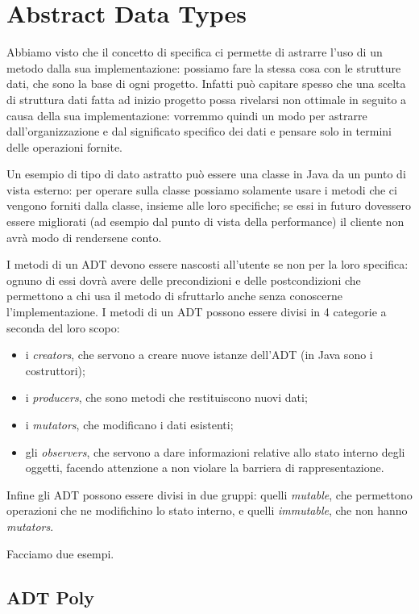 \section{Abstract Data Types}
Abbiamo visto che il concetto di specifica ci permette di astrarre l'uso di un metodo dalla sua implementazione: possiamo fare la stessa cosa con le strutture dati, che sono la base di ogni progetto. Infatti può capitare spesso che una scelta di struttura dati fatta ad inizio progetto possa rivelarsi non ottimale in seguito a causa della sua implementazione: vorremmo quindi un modo per astrarre dall'organizzazione e dal significato specifico dei dati e pensare solo in termini delle operazioni fornite.

Un esempio di tipo di dato astratto può essere una classe in Java da un punto di vista esterno: per operare sulla classe possiamo solamente usare i metodi che ci vengono forniti dalla classe, insieme alle loro specifiche; se essi in futuro dovessero essere migliorati (ad esempio dal punto di vista della performance) il cliente non avrà modo di rendersene conto.

I metodi di un ADT devono essere nascosti all'utente se non per la loro specifica: ognuno di essi dovrà avere delle precondizioni e delle postcondizioni che permettono a chi usa il metodo di sfruttarlo anche senza conoscerne l'implementazione. I metodi di un ADT possono essere divisi in 4 categorie a seconda del loro scopo:
\begin{itemize}
    \item i \emph{creators}, che servono a creare nuove istanze dell'ADT (in Java sono i costruttori);
    \item i \emph{producers}, che sono metodi che restituiscono nuovi dati;
    \item i \emph{mutators}, che modificano i dati esistenti;
    \item gli \emph{observers}, che servono a dare informazioni relative allo stato interno degli oggetti, facendo attenzione a non violare la barriera di rappresentazione.
\end{itemize}
Infine gli ADT possono essere divisi in due gruppi: quelli \emph{mutable}, che permettono operazioni che ne modifichino lo stato interno, e quelli \emph{immutable}, che non hanno \emph{mutators}.

Facciamo due esempi.

\subsection{ADT Poly}
